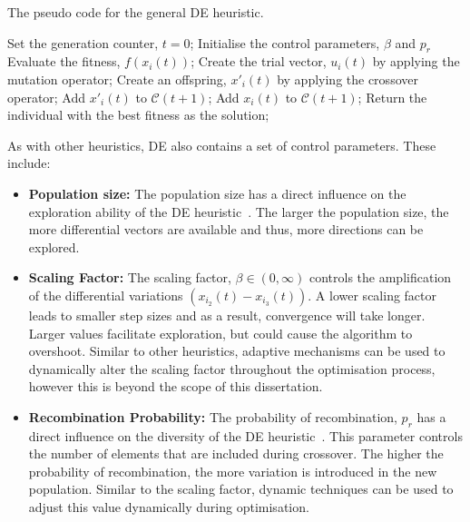 \begin{algorithm}[H]
      \caption{The pseudo code for the general \ac{DE} heuristic.}
      \label{algo:heuristics:de:general_de}
      \begin{algorithmic}
            \State Set the generation counter, $t = 0$;
            \State Initialise the control parameters, $\beta$ and $p_{r}$
            \State Evaluate the fitness, $f(x_{i}(t))$;
            \State Create the trial vector, $u_{i}(t)$ by applying the mutation operator;
            \State Create an offspring, $x'_{i}(t)$ by applying the crossover operator;
            \State Add $x'_{i}(t)$ to $\mathcal{C}(t+1)$;
            \Else
            \State Add $x_{i}(t)$ to $\mathcal{C}(t+1)$;
            \EndIf
            \EndFor
            \EndWhile
            \State Return the individual with the best fitness as the solution;
      \end{algorithmic}
\end{algorithm}

As with other heuristics, \ac{DE} also contains a set of control parameters. These include:

\begin{itemize}
      \item \textbf{Population size:} The population size has a direct influence on the exploration ability of the \acs{DE} heuristic~\cite{ref:engelbrecht:2007}. The larger the population size, the more differential vectors are available and thus, more directions can be explored.

      \item \textbf{Scaling Factor:} The scaling factor, $\beta \in (0, \infty)$ controls the amplification of the differential variations $(x_{i_{2}}(t) - x_{i_{3}}(t))$. A lower scaling factor leads to smaller step sizes and as a result, convergence will take longer. Larger values facilitate exploration, but could cause the algorithm to overshoot. Similar to other heuristics, adaptive mechanisms can be used to dynamically alter the scaling factor throughout the optimisation process, however this is beyond the scope of this dissertation.


      \item \textbf{Recombination Probability:} The probability of recombination, $p_{r}$ has a direct influence on the diversity of the \acs{DE} heuristic~\cite{ref:engelbrecht:2007}. This parameter controls the number of elements that are included during crossover. The higher the probability of recombination, the more variation is introduced in the new population. Similar to the scaling factor, dynamic techniques can be used to adjust this value dynamically during optimisation.
\end{itemize}

